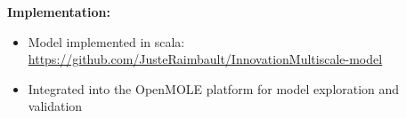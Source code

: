 \documentclass[a0paper]{tikzposter}
\begin{document}
{\begin{multicols}{3}
             \vspace{1.5cm}
             
             \textbf{Implementation:}
             \begin{itemize}
             	\item Model implemented in scala: \url{https://github.com/JusteRaimbault/InnovationMultiscale-model}
             	\item Integrated into the OpenMOLE platform for model exploration and validation	\cite{reuillon2013openmole}
             \end{itemize}

            	
            \end{multicols}

   
		}
		
		
	
\end{document}
